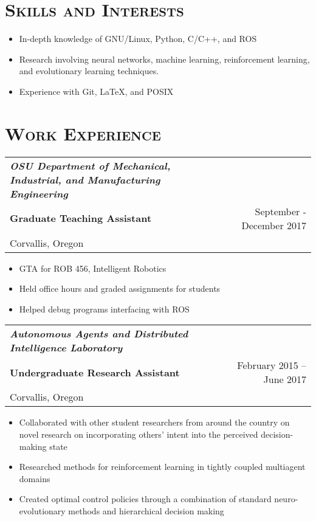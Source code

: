 \documentclass[letterpaper,10pt,titlepage]{article}
\begin{document}
\section*{\textsc{Skills and Interests}}
\begin{itemize} \itemsep1pt \parskip0pt 
\item In-depth knowledge of GNU/Linux, Python, C/C++, and ROS
\item Research involving neural networks, machine learning, reinforcement learning, and evolutionary learning techniques.
\item Experience with Git, \LaTeX, and POSIX
\end{itemize}

\section*{\textsc{Work Experience}}
\begin{tabularx}{\linewidth}{Xr}
\textbf{\textit{OSU Department of Mechanical, Industrial, and Manufacturing Engineering}} & \\
\textbf{Graduate Teaching Assistant}          & September - December 2017\\
Corvallis, Oregon & \\
\end{tabularx}

\begin{itemize} \itemsep1pt \parskip0pt 
\item GTA for ROB 456, Intelligent Robotics
\item Held office hours and graded assignments for students
\item Helped debug programs interfacing with ROS
\end{itemize}

\begin{tabularx}{\linewidth}{Xr}
\textbf{\textit{Autonomous Agents and Distributed Intelligence Laboratory}} & \\
\textbf{Undergraduate Research Assistant}          & February 2015 -- June 2017\\
Corvallis, Oregon & \\
\end{tabularx}
\begin{itemize} \itemsep1pt \parskip0pt 
\item Collaborated with other student researchers from around the country on novel research on incorporating others' intent into the perceived decision-making state
\item Researched methods for reinforcement learning in tightly coupled multiagent domains
\item Created optimal control policies through a combination of standard neuro-evolutionary methods and hierarchical decision making
\end{itemize}
\end{document}
